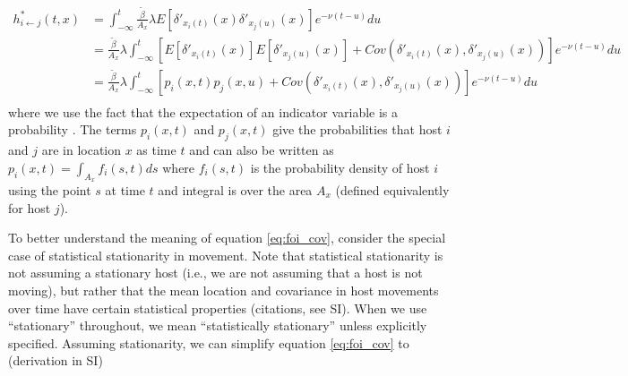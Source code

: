 \documentclass[letterpaper]{article}
\begin{document}
\begin{equation}
    \begin{aligned}
        h^*_{i \leftarrow j}(t, x) &= \int_{-\infty}^{t} \frac{\tilde{\beta}}{A_x} \lambda E[\delta'_{x_i(t)}(x) \delta'_{x_j(u)}(x)] e^{-\nu(t - u)} du \\
        &= \frac{\tilde{\beta}}{A_x} \lambda \int_{-\infty}^{t} [E[\delta'_{x_i(t)}(x)] E[\delta'_{x_j(u)}(x)] + Cov(\delta'_{x_i(t)}(x), \delta'_{x_j(u)}(x))] e^{-\nu(t - u)} du \\
        &= \frac{\tilde{\beta}}{A_x} \lambda \int_{-\infty}^{t} [p_i(x, t) p_j(x, u) + Cov(\delta'_{x_i(t)}(x), \delta'_{x_j(u)}(x))] e^{-\nu(t - u)} du \\
    \end{aligned}
    \label{eq:foi_cov}
\end{equation}
where we use the fact that the expectation of an indicator variable is a probability \citep{Grimmett2001}. The terms $p_i(x, t)$ and $p_j(x, t)$ give the probabilities that host $i$ and $j$ are in location $x$ as time $t$ and can also be written as $p_i(x, t) = \int_{A_x} f_i(s, t) ds$ where $f_i(s, t)$ is the probability density of host $i$ using the point $s$ at time $t$ and integral is over the area $A_x$ (defined equivalently for host $j$).



To better understand the meaning of equation \ref{eq:foi_cov}, consider the special case of statistical stationarity in movement. Note that statistical stationarity is not assuming a stationary host (i.e., we are not assuming that a host is not moving), but rather that the mean location and covariance in host movements over time have certain statistical properties (citations, see SI). When we use ``stationary'' throughout, we mean ``statistically stationary'' unless explicitly specified.  Assuming stationarity, we can simplify equation \ref{eq:foi_cov} to (derivation in SI)
\end{document}
